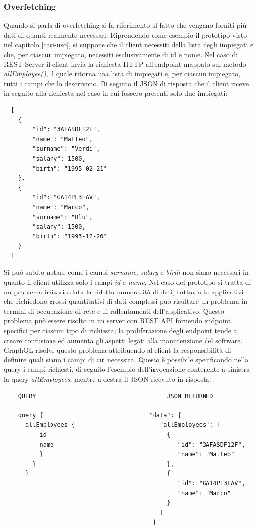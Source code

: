 \subsubsection*{Overfetching}
Quando si parla di overfetching si fa riferimento al fatto che vengano forniti più dati di quanti realmente necessari. Riprendendo come esempio il prototipo visto nel capitolo \ref{casi-uso}, si suppone che il client necessiti della lista degli impiegati e che, per ciascun impiegato, necessiti  esclusivamente di id e nome. Nel caso di REST Server il client invia la richiesta HTTP all'endpoint mappato sul metodo \textit{allEmployee()}, il quale ritorna una lista di impiegati e, per ciascun impiegato, tutti i campi che lo descrivono. Di seguito il JSON di risposta che il client riceve in seguito alla richiesta nel caso in cui fossero presenti solo due impiegati:
\begin{verbatim}
  [
    {
        "id": "3AFASDF12F",
        "name": "Matteo",
        "surname": "Verdi",
        "salary": 1500,
        "birth": "1995-02-21"
    },
    {
        "id": "GA14PL3FAV",
        "name": "Marco",
        "surname": "Blu",
        "salary": 1500,
        "birth": "1993-12-20"
    }
  ]
\end{verbatim}
Si può subito notare come i campi \textit{surname}, \textit{salary} e \textit{birth} non siano necessari in quanto il client utilizza solo i campi \textit{id} e \textit{name}. Nel caso del prototipo si tratta di un problema irrisorio data la ridotta numerosità di dati, tuttavia in applicativi che richiedono grossi quantitativi di dati complessi può risultare un problema in termini di occupazione di rete e di rallentamenti dell'applicativo. Questo problema può essere risolto in un server con REST API fornendo endpoint specifici per ciascun tipo di richiesta; la proliferazione degli endpoint tende a creare confusione ed aumenta gli aspetti legati alla manutenzione del software.\\
GraphQL risolve questo problema attribuendo al client la responsabilità di definire quali siano i campi di cui necessita. Questo è possibile specificando nella query i campi richiesti, di seguito l'esempio dell'invocazione contenente a sinistra la query \textit{allEmployees}, mentre a destra il JSON ricevuto in risposta:
\begin{verbatim}
    QUERY                                     JSON RETURNED

    query {                              "data": {
      allEmployees {                        "allEmployees": [
          id                                  {
          name                                   "id": "3AFASDF12F",
          }                                      "name": "Matteo"
        }                                     },
      }                                       {
                                                 "id": "GA14PL3FAV",
                                                 "name": "Marco"
                                              }
                                            ]
                                          }
\end{verbatim}
